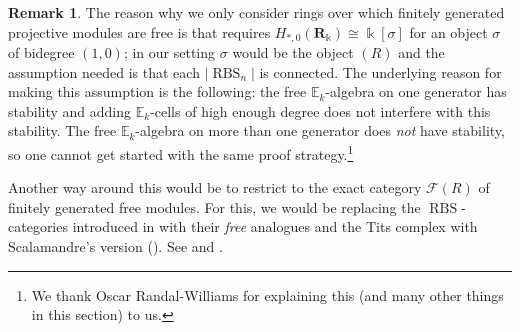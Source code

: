 \documentclass[12pt, reqno]{amsart}
\theoremstyle{plain}
\theoremstyle{definition}
\newtheorem{remark}[theorem]{Remark}
\begin{document}
\begin{remark}\label{improved stability}
The reason why we only consider rings over which finitely generated projective modules are free is that \cite[Theorem 18.3]{GalatiusKupersRandalWilliams} requires $H_{\ast,0}(\mathbf{R}_\Bbbk)\cong \Bbbk [\sigma]$ for an object $\sigma$ of bidegree $(1,0)$; in our setting $\sigma$ would be the object $(R)$ and the assumption needed is that each $|\operatorname{RBS}_n|$ is connected. The underlying reason for making this assumption is the following: the free $\mathbb{E}_k$-algebra on one generator has stability and adding $\mathbb{E}_k$-cells of high enough degree does not interfere with this stability. The free $\mathbb{E}_k$-algebra on more than one generator does \textit{not} have stability, so one cannot get started with the same proof strategy.\footnote{We thank Oscar Randal-Williams for explaining this (and many other things in this section) to us.}

Another way around this would be to restrict to the exact category $\mathcal{F}(R)$ of finitely generated free modules. For this, we would be replacing the $\operatorname{RBS}$-categories introduced in \cite{ClausenOrsnesJansen} with their \textit{free} analogues and the Tits complex with Scalamandre's version (\cite{Scalamandre}). See  and .
\end{remark}
\end{document}
